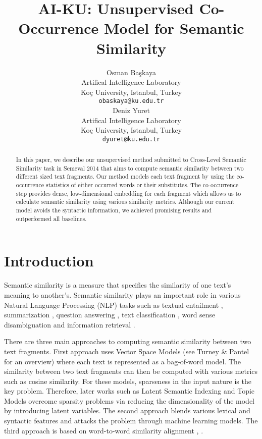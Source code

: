 \documentclass[11pt]{article}
\title{AI-KU: Unsupervised Co-Occurrence Model for Semantic Similarity}
\author{Osman Ba\c{s}kaya \\
	  Artifical Intelligence Laboratory \\
	  Ko\c{c} University, Istanbul, Turkey \\
  {\tt obaskaya@ku.edu.tr} \\\And
  Deniz Yuret \\
	  Artifical Intelligence Laboratory \\
	  Ko\c{c} University, Istanbul, Turkey \\
  {\tt dyuret@ku.edu.tr} \\}
\date{}
\begin{document}
\maketitle
\begin{abstract}

In this paper, we describe our unsupervised method submitted to Cross-Level Semantic Similarity task in Semeval 2014 that aims to compute semantic similarity between two different sized text fragments. Our method models each text fragment by using the co-occurrence statistics of either occurred words or their substitutes. The co-occurrence step provides dense, low-dimensional embedding for each fragment which allows us to calculate semantic similarity using various similarity metrics. Although our current model avoids the syntactic information, we achieved promising results and outperformed all baselines.

\end{abstract}

\section{Introduction}
\label{intro}

Semantic similarity is a measure that specifies the similarity of one text's meaning to another's. Semantic similarity plays an important role in various Natural Language Processing (NLP) tasks such as textual entailment \cite{berant2012entail}, summarization \cite{lin2003summarization}, question answering \cite{surdeanu2011questionans}, text classification \cite{sebastiani2002textclass}, word sense disambiguation \cite{schutze98automatic} and information retrieval \cite{park2005infret}. 

There are three main approaches to computing semantic similarity between two text fragments. First approach uses Vector Space Models (see Turney \& Pantel  for an overview) where each text is represented as a bag-of-word model. The similarity between two text fragments can then be computed with various metrics such as cosine similarity. For these models, sparseness in the input nature is the key problem. Therefore, later works such as Latent Semantic Indexing  \cite{deerwester90indexing} and Topic Models \cite{blei03latent} overcome sparsity problems via reducing the dimensionality of the model by introducing latent variables. The second approach blends various lexical and syntactic features and attacks the problem through machine learning models. The third approach is based on word-to-word similarity alignment \cite{pilehvar2013align}, \cite{islam2008semantic}.
\end{document}
